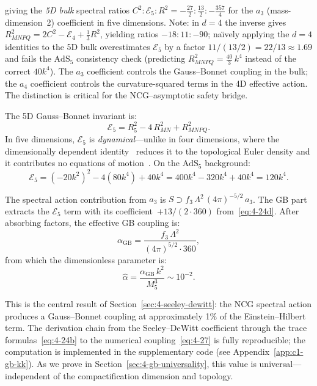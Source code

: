 giving the \emph{5D bulk} spectral ratios $C^2 : \mathcal{E}_5 : R^2 = -\tfrac{27}{2} : \tfrac{13}{2} : -\tfrac{357}{4}$ for the $a_3$ (mass-dimension~2) coefficient in five dimensions. Note: in $d = 4$ the inverse gives $R_{MNPQ}^2 = 2C^2 - \mathcal{E}_4 + \tfrac{1}{3}R^2$, yielding ratios $-18 : 11 : -90$; na\"{\i}vely applying the $d = 4$ identities to the 5D bulk overestimates $\mathcal{E}_5$ by a factor $11/(13/2) = 22/13 \approx 1.69$ and fails the $\mathrm{AdS}_5$ consistency check (predicting $R_{MNPQ}^2 = \tfrac{40}{3}\,k^4$ instead of the correct $40k^4$). The $a_3$ coefficient controls the Gauss--Bonnet coupling in the bulk; the $a_4$ coefficient controls the curvature-squared terms in the 4D effective action. The distinction is critical for the NCG--asymptotic safety bridge.

The 5D Gauss--Bonnet invariant is:
\begin{equation}
  \mathcal{E}_5 = R_5^2 - 4\, R_{MN}^2 + R_{MNPQ}^2.
  \label{eq:4-24}
\end{equation}
In five dimensions, $\mathcal{E}_5$ is \emph{dynamical}---unlike in four dimensions, where the dimensionally dependent identity~\cite{ch4:Lovelock1970} reduces it to the topological Euler density and it contributes no equations of motion~\cite{ch4:Lovelock1971}. On the $\mathrm{AdS}_5$ background:
\begin{equation}
  \mathcal{E}_5 = (-20k^2)^2 - 4(80k^4) + 40k^4
               = 400k^4 - 320k^4 + 40k^4 = 120k^4.
  \label{eq:4-25}
\end{equation}

The spectral action contribution from $a_3$ is $S \supset f_3\, \Lambda^2\, (4\pi)^{-5/2}\, a_3$. The GB part extracts the $\mathcal{E}_5$ term with its coefficient~$+13/(2 \cdot 360)$ from~\eqref{eq:4-24d}. After absorbing factors, the effective GB coupling is:
\begin{equation}
  \alpha_{\mathrm{GB}} = \frac{f_3\, \Lambda^2}{(4\pi)^{5/2} \cdot 360},
  \label{eq:4-26}
\end{equation}
from which the dimensionless parameter is:
\begin{equation}
  \hat{\alpha} = \frac{\alpha_{\mathrm{GB}}\, k^2}{M_5^3} \sim 10^{-2}.
  \label{eq:4-27}
\end{equation}

This is the central result of Section~\ref{sec:4-seeley-dewitt}: the NCG spectral action produces a Gauss--Bonnet coupling at approximately 1\% of the Einstein--Hilbert term. The derivation chain from the Seeley--DeWitt coefficient through the trace formulas~\eqref{eq:4-24b} to the numerical coupling~\eqref{eq:4-27} is fully reproducible; the computation is implemented in the supplementary code (see Appendix~\ref{app:c1-gb-kk}). As we prove in Section~\ref{sec:4-gb-universality}, this value is universal---independent of the compactification dimension and topology.


